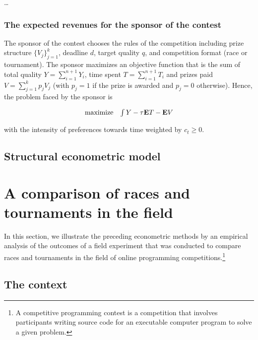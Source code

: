 \documentclass[12pt, titlepage, draft]{article} \usepackage[utf8]{inputenc}                           \usepackage[english]{babel}                           \usepackage{amsmath,amssymb,amsfonts}                 \usepackage{xcolor,tikz,graphicx,subfig}              \usepackage{rotating,multirow,array,dcolumn,booktabs} \usepackage{natbib}                                   
\begin{document}
\ldots{}

\subsubsection{The expected revenues for the sponsor of the
contest}\label{the-expected-revenues-for-the-sponsor-of-the-contest}

The sponsor of the contest chooses the rules of the competition
including prize structure \(\{V_j\}_{j=1}^k\), deadline \(d\), target
quality \(q\), and competition format (race or tournament). The sponsor
maximizes an objective function that is the sum of total quality
\(Y=\sum_{i=1}^{n+1} Y_i\), time spent \(T=\sum_{i=1}^{n+1} T_i\) and
prizes paid \(V=\sum_{j=1}^k p_{j} V_j\) (with \(p_j=1\) if the prize is
awarded and \(p_j=0\) otherwise). Hence, the problem faced by the
sponsor is

\begin{equation}
  \begin{array}{ll}
    \mbox{maximize} & \int {Y}   -  \tau {\bf E}{T} - {\bf E}{V}
  \end{array}
\end{equation}

with the intensity of preferences towards time weighted by
\(c_t\geq 0\).

\subsection{Structural econometric
model}\label{structural-econometric-model}
 \section{A comparison of races and tournaments in the
field}\label{a-comparison-of-races-and-tournaments-in-the-field}

In this section, we illustrate the preceding econometric methods by an
empirical analysis of the outcomes of a field experiment that was
conducted to compare races and tournaments in the field of online
programming competitions.\footnote{A competitive programming contest is
  a competition that involves participants writing source code for an
  executable computer program to solve a given problem.}

\subsection{The context}\label{the-context}
\end{document}
